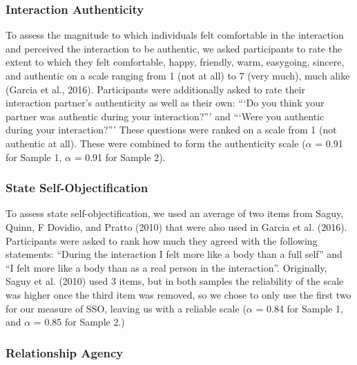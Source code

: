 \documentclass[man]{apa6}
\begin{document}
\subsubsection{Interaction Authenticity}\label{interaction-authenticity}

To assess the magnitude to which individuals felt comfortable in the
interaction and perceived the interaction to be authentic, we asked
participants to rate the extent to which they felt comfortable, happy,
friendly, warm, easygoing, sincere, and authentic on a scale ranging
from 1 (not at all) to 7 (very much), much alike (Garcia et al., 2016).
Participants were additionally asked to rate their interaction partner's
authenticity as well as their own: \enquote{`Do you think your partner
was authentic during your interaction?}' and \enquote{`Were you
authentic during your interaction?}' These questions were ranked on a
scale from 1 (not authentic at all). These were combined to form the
authenticity scale (\(\alpha\) = 0.91 for Sample 1, \(\alpha\) = 0.91
for Sample 2).

\subsubsection{State
Self-Objectification}\label{state-self-objectification}

To assess state self-objectification, we used an average of two items
from Saguy, Quinn, F Dovidio, and Pratto (2010) that were also used in
Garcia et al. (2016). Participants were asked to rank how much they
agreed with the following statements: \enquote{During the interaction I
felt more like a body than a full self} and \enquote{I felt more like a
body than as a real person in the interaction}. Originally, Saguy et al.
(2010) used 3 items, but in both samples the reliability of the scale
was higher once the third item was removed, so we chose to only use the
first two for our measure of SSO, leaving us with a reliable scale
(\(\alpha\) = 0.84 for Sample 1, and \(\alpha\) = 0.85 for Sample 2.)

\subsubsection{Relationship Agency}\label{relationship-agency}
\end{document}
